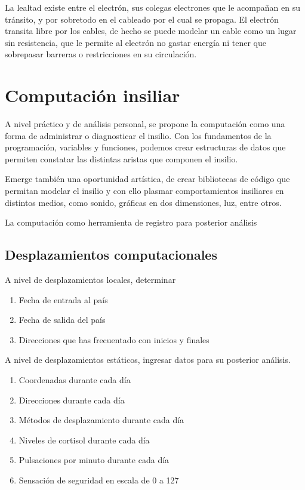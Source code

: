 \documentclass[./informes.tex]{subfiles}
\begin{document}
La lealtad existe entre el electrón, sus colegas electrones que le acompañan en su tránsito, y por sobretodo en el cableado por el cual se propaga. El electrón transita libre por los cables, de hecho se puede modelar un cable como un lugar sin resistencia, que le permite al electrón no gastar energía ni tener que sobrepasar barreras o restricciones en su circulación.


\section{Computación insiliar}

A nivel práctico y de análisis personal, se propone la computación como una forma de administrar o diagnosticar el insilio. Con los fundamentos de la programación, variables y funciones, podemos crear estructuras de datos que permiten constatar las distintas aristas que componen el insilio.

Emerge también una oportunidad artística, de crear bibliotecas de código que permitan modelar el insilio y con ello plasmar comportamientos insiliares en distintos medios, como sonido, gráficas en dos dimensiones, luz, entre otros.

La computación como herramienta de registro para posterior análisis

\subsection{Desplazamientos computacionales}

A nivel de desplazamientos locales, determinar

\begin{enumerate}
  \item Fecha de entrada al país
  \item Fecha de salida del país
  \item Direcciones que has frecuentado con inicios y finales
\end{enumerate}

A nivel de desplazamientos estáticos, ingresar datos para su posterior análisis.

\begin{enumerate}
  \item Coordenadas durante cada día
  \item Direcciones durante cada día
  \item Métodos de desplazamiento durante cada día
  \item Niveles de cortisol durante cada día
  \item Pulsaciones por minuto durante cada día
  \item Sensación de seguridad en escala de 0 a 127
\end{enumerate}
\end{document}
